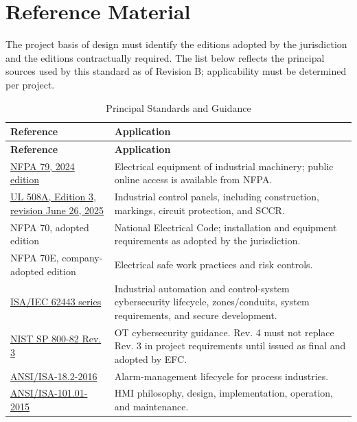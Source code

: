 \chapter{Reference Material}
The project basis of design must identify the editions adopted by the jurisdiction and the editions contractually required. The list below reflects the principal sources used by this standard as of Revision B; applicability must be determined per project.

\begin{longtable}{@{}P{5.27cm}P{10.79cm}@{}}
\caption{Principal Standards and Guidance}\label{tab:references}\\
\toprule {}\textbf{Reference} & \textbf{Application}\\ \midrule
\endfirsthead
\toprule {}\textbf{Reference} & \textbf{Application}\\ \midrule
\endhead
\href{https://link.nfpa.org/all-publications/79/2024}{NFPA 79, 2024 edition} & Electrical equipment of industrial machinery; public online access is available from NFPA.\\
\href{https://www.shopulstandards.com/ProductDetail.aspx?UniqueKey=48543}{UL 508A, Edition 3, revision June 26, 2025} & Industrial control panels, including construction, markings, circuit protection, and SCCR.\\
NFPA 70, adopted edition & National Electrical Code; installation and equipment requirements as adopted by the jurisdiction.\\
NFPA 70E, company-adopted edition & Electrical safe work practices and risk controls.\\
\href{https://www.isa.org/standards-and-publications/isa-standards/isa-iec-62443-series-of-standards}{ISA/IEC 62443 series} & Industrial automation and control-system cybersecurity lifecycle, zones/conduits, system requirements, and secure development.\\
\href{https://csrc.nist.gov/pubs/sp/800/82/r3/final}{NIST SP 800-82 Rev. 3} & OT cybersecurity guidance. Rev. 4 must not replace Rev. 3 in project requirements until issued as final and adopted by EFC.\\
\href{https://www.isa.org/products/ansi-isa-18-2-2016-management-of-alarm-systems-for}{ANSI/ISA-18.2-2016} & Alarm-management lifecycle for process industries.\\
\href{https://www.isa.org/products/isa-101-01-2015-human-machine-interfaces-for}{ANSI/ISA-101.01-2015} & HMI philosophy, design, implementation, operation, and maintenance.\\

\end{longtable}
